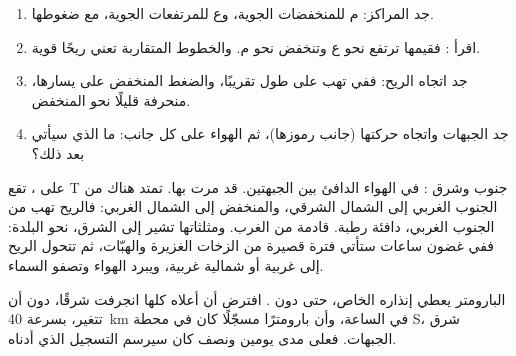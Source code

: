 \begin{method}
\begin{enumerate}
  \item جد المراكز: م للمنخفضات الجوية، وع للمرتفعات الجوية،
        مع ضغوطها.
  \item اقرأ : فقيمها ترتفع نحو ع وتنخفض نحو م.
        والخطوط المتقاربة تعني ريحًا قوية.
  \item جد اتجاه الريح: ففي  تهب على طول 
        تقريبًا، والضغط المنخفض على يسارها، منحرفة قليلًا نحو المنخفض.
  \item جد الجبهات واتجاه حركتها (جانب رموزها)، ثم الهواء على كل
        جانب: ما الذي سيأتي بعد ذلك؟
\end{enumerate}
\end{method}

\begin{example}
على ، تقع T جنوب  وشرق : في الهواء
الدافئ بين الجبهتين.  قد مرت بها.  تمتد هناك
من الجنوب الغربي إلى الشمال الشرقي، والمنخفض إلى الشمال الغربي: فالريح تهب
من الجنوب الغربي، دافئة رطبة.  قادمة من الغرب. ومثلثاتها تشير
إلى الشرق، نحو البلدة: ففي غضون ساعات ستأتي فترة قصيرة من الزخات الغزيرة
والهبّات، ثم تتحول الريح إلى غربية أو شمالية غربية، ويبرد الهواء وتصفو
السماء.
\end{example}

البارومتر يعطي إنذاره الخاص، حتى دون . افترض أن  أعلاه كلها انجرفت
شرقًا، دون أن تتغير، بسرعة \qty{40}{km} في الساعة، وأن بارومترًا مسجّلًا كان
في محطة S، شرق الجبهات. فعلى مدى يومين ونصف كان سيرسم التسجيل
الذي أدناه.

